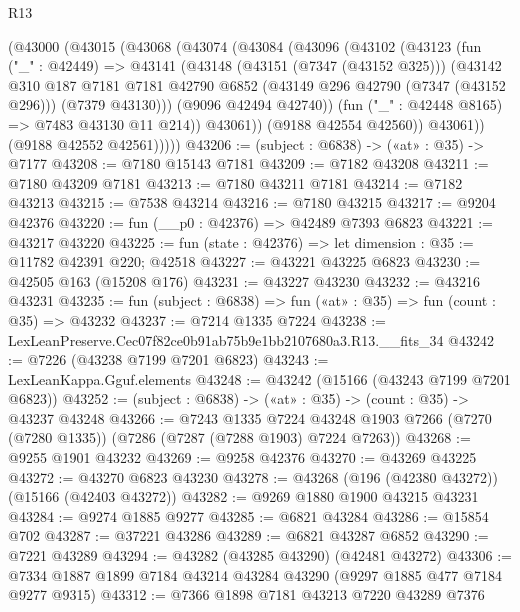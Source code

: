 \begin{lexlean}{R13}
\begin{coremodule}
        (@43000
          (@43015
            (@43068
              (@43074
                (@43084
                  (@43096
                    (@43102
                      (@43123
                        (fun ("_" : @42449) =>
                        @43141
                          (@43148
                            (@43151 (@7347 (@43152 @325)))
                            (@43142
                              @310
                              @187
                              @7181
                              @7181
                              @42790
                              @6852
                              (@43149 @296 @42790 (@7347 (@43152 @296)))
                              (@7379 @43130)))
                          (@9096 @42494 @42740))
                        (fun ("_" : @42448 @8165) => @7483 @43130 @11 @214))
                      @43061))
                  (@9188 @42554 @42560))
                @43061))
            (@9188 @42552 @42561)))))
@43206 := (subject : @6838) -> («at» : @35) -> @7177
@43208 := @7180 @15143 @7181
@43209 := @7182 @43208
@43211 := @7180 @43209 @7181
@43213 := @7180 @43211 @7181
@43214 := @7182 @43213
@43215 := @7538 @43214
@43216 := @7180 @43215
@43217 := @9204 @42376
@43220 := fun (__p0 : @42376) => @42489 @7393 @6823
@43221 := @43217 @43220
@43225 := fun (state : @42376) => let dimension : @35 := @11782 @42391 @220; @42518
@43227 := @43221 @43225 @6823
@43230 := @42505 @163 (@15208 @176)
@43231 := @43227 @43230
@43232 := @43216 @43231
@43235 := fun (subject : @6838) => fun («at» : @35) => fun (count : @35) => @43232
@43237 := @7214 @1335 @7224
@43238 := LexLeanPreserve.Cec07f82ce0b91ab75b9e1bb2107680a3.R13.__fits_34
@43242 := @7226 (@43238 @7199 @7201 @6823)
@43243 := LexLeanKappa.Gguf.elements
@43248 := @43242 (@15166 (@43243 @7199 @7201 @6823))
@43252 := (subject : @6838) -> («at» : @35) -> (count : @35) -> @43237 @43248
@43266 := @7243
    @1335
    @7224
    @43248
    @1903
    @7266
    (@7270 (@7280 @1335))
    (@7286 (@7287 (@7288 @1903) @7224 @7263))
@43268 := @9255 @1901 @43232
@43269 := @9258 @42376
@43270 := @43269 @43225
@43272 := @43270 @6823 @43230
@43278 := @43268 (@196 (@42380 @43272)) (@15166 (@42403 @43272))
@43282 := @9269 @1880 @1900 @43215 @43231
@43284 := @9274 @1885 @9277
@43285 := @6821 @43284
@43286 := @15854 @702
@43287 := @37221 @43286
@43289 := @6821 @43287 @6852
@43290 := @7221 @43289
@43294 := @43282 (@43285 @43290) (@42481 @43272)
@43306 := @7334 @1887 @1899 @7184 @43214 @43284 @43290 (@9297 @1885 @477 @7184 @9277 @9315)
@43312 := @7366 @1898 @7181 @43213 @7220 @43289 @7376

\end{coremodule}
\end{lexlean}
